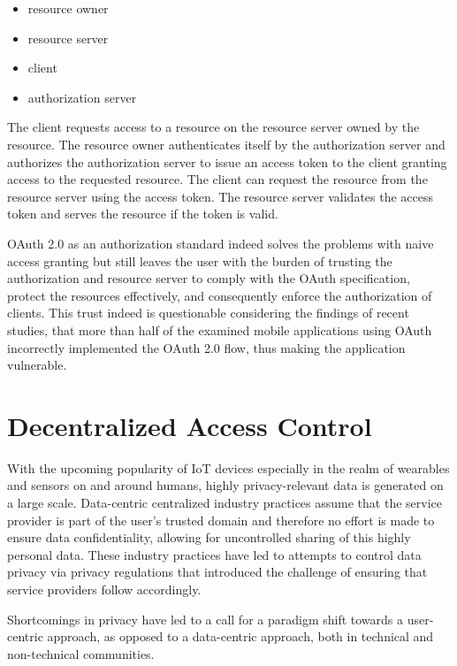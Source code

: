 \documentclass[conference]{IEEEtran}
\begin{document}
\begin{itemize}
  \item resource owner
  \item resource server
  \item client
  \item authorization server
\end{itemize}

The client requests access to a resource on the resource server owned by the resource.
The resource owner authenticates itself by the authorization server and authorizes the authorization server to issue an access token to the client granting access to the requested resource.
The client can request the resource from the resource server using the access token.
The resource server validates the access token and serves the resource if the token is valid.

OAuth 2.0 as an authorization standard indeed solves the problems with naive access granting but still leaves the user with the burden of trusting the authorization and resource server to comply with the OAuth specification, protect the resources effectively, and consequently enforce the authorization of clients.
This trust indeed is questionable considering the findings of recent studies, that more than half of the examined mobile applications using OAuth incorrectly implemented the OAuth 2.0 flow, thus making the application vulnerable. \cite{chen_oauth_2014}

\section{Decentralized Access Control}
With the upcoming popularity of IoT devices especially in the realm of wearables and sensors on and around humans, highly privacy-relevant data is generated on a large scale. \cite{zhang_cloud_2015}
Data-centric centralized industry practices assume that the service provider is part of the user's trusted domain and therefore no effort is made to ensure data confidentiality, allowing for uncontrolled sharing of this highly personal data. \cite{shafagh_droplet_2020}
These industry practices have led to attempts to control data privacy via privacy regulations that introduced the challenge of ensuring that service providers follow accordingly. \cite{noauthor_general_nodate}

Shortcomings in privacy have led to a call for a paradigm shift towards a user-centric approach, as opposed to a data-centric approach, both in technical and non-technical communities. \cite{ernstberger_sok_2023, shafagh_droplet_2020}
\end{document}
